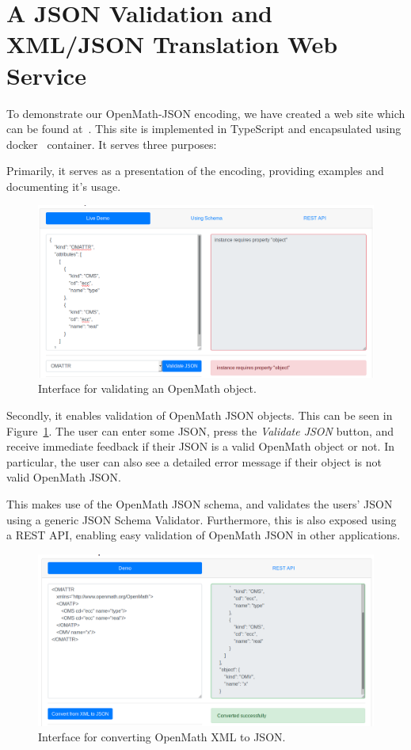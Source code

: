 \section{A JSON Validation and XML/JSON Translation Web Service}

To demonstrate our OpenMath-JSON encoding, we have created a web site which can be found
at~\cite{openmathjson:web}.  This site is implemented in TypeScript and encapsulated using
docker~\cite{docker:webpage} container. It serves three purposes:

Primarily, it serves as a presentation of the encoding, providing examples and documenting it's usage. 

\begin{figure}\centering
  \includegraphics[width=\textwidth]{images/validate}
  \caption{Interface for validating an OpenMath object. }\label{figure:validate}
\end{figure}

Secondly, it enables validation of OpenMath JSON objects. This can be seen in Figure~\ref{figure:validate}.
The user can enter some JSON, press the \textit{Validate JSON} button, and receive immediate feedback if their JSON is a valid OpenMath object or not. 
In particular, the user can also see a detailed error message if their object is not valid OpenMath JSON. 

This makes use of the OpenMath JSON schema, and validates the users' JSON using a generic JSON Schema Validator. 
Furthermore, this is also exposed using a REST API, enabling easy validation of OpenMath JSON in other applications. 

\begin{figure}\centering
  \includegraphics[width=\textwidth]{images/xml2json}
  \caption{Interface for converting OpenMath XML to JSON.}\label{figure:xml2json}
\end{figure}

